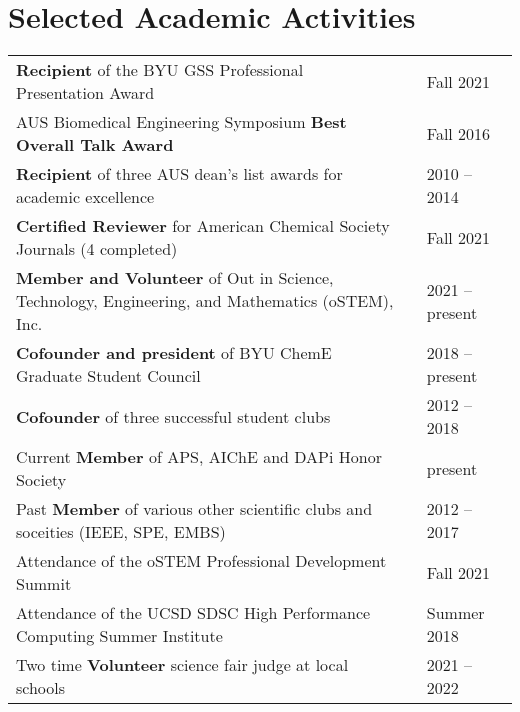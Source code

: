 \documentclass[letterpaper,11pt]{article}
\begin{document}

\vspace{-0.1cm}
\section*{Selected Academic Activities}
\begin{tabular}{@{}p{} p{} l@{}}
  \textbf{Recipient} of the BYU GSS Professional Presentation Award                                       & & Fall 2021 \\[4pt]
  AUS Biomedical Engineering Symposium \textbf{Best Overall Talk Award}                                   & & Fall 2016 \\[4pt]
  \textbf{Recipient} of three AUS dean's list awards for academic excellence                              & & 2010 -- 2014 \\[4pt]
  \textbf{Certified Reviewer} for American Chemical Society Journals (4 completed)                        & & Fall 2021 \\[4pt]
  \textbf{Member and Volunteer} of Out in Science, Technology, Engineering, and Mathematics (oSTEM), Inc. & & 2021 -- present \\[4pt]
  \textbf{Cofounder and president} of BYU ChemE Graduate Student Council                                  & & 2018 -- present \\[4pt]
  \textbf{Cofounder} of three successful student clubs                                                    & & 2012 -- 2018 \\[4pt]
  Current \textbf{Member} of APS, AIChE and DAPi Honor Society                                            & & present \\[4pt]
  Past \textbf{Member} of various other scientific clubs and soceities (IEEE, SPE, EMBS)                  & & 2012 -- 2017 \\[4pt]
  Attendance of the oSTEM Professional Development Summit                                                 & & Fall 2021 \\[4pt]
  Attendance of the UCSD SDSC High Performance Computing Summer Institute                                 & & Summer 2018 \\[4pt]
  Two time \textbf{Volunteer} science fair judge at local schools                                         & & 2021 -- 2022 \\[4pt]

\end{tabular}
\end{document}
